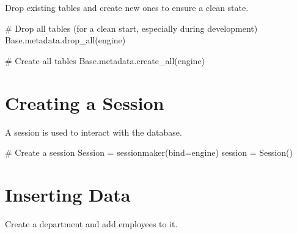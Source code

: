 \documentclass[
  letterpaper,
  DIV=11,
  numbers=noendperiod]{scrreprt}
\newenvironment{Shaded}{\begin{snugshade}}{\end{snugshade}}
\newcommand{\CommentTok}[1]{\textcolor[rgb]{0.37,0.37,0.37}{#1}}
\newcommand{\NormalTok}[1]{\textcolor[rgb]{0.00,0.23,0.31}{#1}}
\newcommand{\OperatorTok}[1]{\textcolor[rgb]{0.37,0.37,0.37}{#1}}
\begin{document}
Drop existing tables and create new ones to ensure a clean state.

\begin{Shaded}
\begin{Highlighting}[]
\CommentTok{\# Drop all tables (for a clean start, especially during development)}
\NormalTok{Base.metadata.drop\_all(engine)}

\CommentTok{\# Create all tables}
\NormalTok{Base.metadata.create\_all(engine)}
\end{Highlighting}
\end{Shaded}

\section{Creating a Session}\label{creating-a-session-1}

A session is used to interact with the database.

\begin{Shaded}
\begin{Highlighting}[]
\CommentTok{\# Create a session}
\NormalTok{Session }\OperatorTok{=}\NormalTok{ sessionmaker(bind}\OperatorTok{=}\NormalTok{engine)}
\NormalTok{session }\OperatorTok{=}\NormalTok{ Session()}
\end{Highlighting}
\end{Shaded}

\section{Inserting Data}\label{inserting-data-2}

Create a department and add employees to it.
\end{document}
